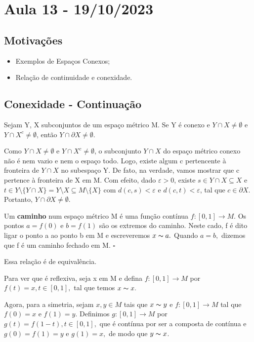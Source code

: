 \documentclass[metric_notes.tex]{subfiles}
\begin{document}
\section{Aula 13 - 19/10/2023}
\subsection{Motivações}
\begin{itemize}
	\item Exemplos de Espaços Conexos;
	\item Relação de continuidade e conexidade.
\end{itemize}
\subsection{Conexidade - Continuação}
\begin{theorem*}[Alfândega]
	Sejam Y, X subconjuntos de um espaço métrico M. Se Y é conexo e \(Y\cap X \neq\emptyset\) e \(Y\cap X^{c}\neq\emptyset\), então
	\(Y\cap \partial X \neq\emptyset.\)
\end{theorem*}
\begin{proof*}
	Como \(Y\cap X \neq\emptyset\) e \(Y\cap X^{c} \neq\emptyset\), o subconjunto \(Y \cap X\) do espaço métrico conexo
	não é nem vazio e nem o espaço todo. Logo, existe algum c pertencente à fronteira de \(Y\cap X\) no subespaço Y. De fato,
	na verdade, vamos mostrar que c pertence à fronteira de X em M. Com efeito, dado \(\varepsilon >0\), existe \(s\in Y\cap X\subseteq{X}\) e
	\(t\in Y\setminus\{Y\cap X\} = Y\setminus{X}\subseteq{M\setminus\{X\}}\) com \(d(c, s) < \varepsilon \) e \(d(c, t) < \varepsilon \), tal que
	\(c\in \partial X\). Portanto, \(Y\cap \partial X \neq\emptyset.\) \qedsymbol
\end{proof*}
\begin{def*}
	Um \textbf{caminho} num espaço métrico M é uma função contínua \(f:[0, 1]\rightarrow M.\) Os pontos \(a = f(0)\) e \(b = f(1)\) são os extremos
	do caminho. Neste cado, f é dito ligar o ponto a ao ponto b em M e escreveremos \(x\thicksim a.\) Quando \(a = b,\) dizemos que f é um caminho fechado
	em M. \(\square\)
\end{def*}
Essa relação é de equivalência.

Para ver que é reflexiva, seja x em M e defina \(f:[0, 1]\rightarrow M\) por \(f(t) = x, t\in [0, 1],\) tal que temos \(x\thicksim x.\)

Agora, para a simetria, sejam \(x, y\in M\) tais que \(x\thicksim y\) e \(f:[0, 1]\rightarrow M\) tal que \(f(0) = x\) e \(f(1) = y\). Definimos \(g:[0, 1]\rightarrow M\) por
\(g(t) = f(1-t), t\in [0, 1],\) que é contínua por ser a composta de contínua e \(g(0) = f(1) = y\) e \(g(1) = x,\) de modo que \(y\thicksim x\).
\end{document}
